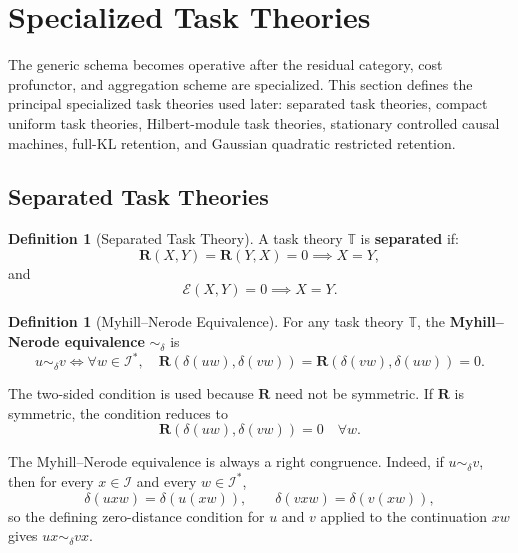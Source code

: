 \documentclass[12pt]{article}
\theoremstyle{definition}
\newtheorem{definition}[theorem]{Definition}
\begin{document}
\section{Specialized Task Theories}
\label{sec:specialized}

The generic schema becomes operative after the residual category, cost
profunctor, and aggregation scheme are specialized.  This section defines the
principal specialized task theories used later: separated task theories,
compact uniform task theories, Hilbert-module task theories, stationary
controlled causal machines, full-KL retention, and Gaussian quadratic
restricted retention.

\subsection{Separated Task Theories}
\label{subsec:separated}

\begin{definition}[Separated Task Theory]
\label{def:separated-task}
A task theory $\mathbb T$ is \textbf{separated} if:
\[
\mathbf R(X,Y)=\mathbf R(Y,X)=0
\implies
X=Y,
\]
and
\[
\mathcal E(X,Y)=0
\implies
X=Y.
\]
\end{definition}

\begin{definition}[Myhill--Nerode Equivalence]
\label{def:nerode}
For any task theory $\mathbb T$, the \textbf{Myhill--Nerode equivalence}
$\sim_\delta$ is
\[
u\sim_\delta v
\iff
\forall w\in\mathcal I^*,
\quad
\mathbf R(\delta(uw),\delta(vw))
=
\mathbf R(\delta(vw),\delta(uw))
=
0.
\]
\end{definition}

The two-sided condition is used because $\mathbf R$ need not be symmetric.  If
$\mathbf R$ is symmetric, the condition reduces to
\[
\mathbf R(\delta(uw),\delta(vw))=0
\quad
\forall w.
\]

The Myhill--Nerode equivalence is always a right congruence.  Indeed, if
$u\sim_\delta v$, then for every $x\in\mathcal I$ and every
$w\in\mathcal I^*$,
\[
\delta(uxw)=\delta(u(xw)),
\qquad
\delta(vxw)=\delta(v(xw)),
\]
so the defining zero-distance condition for $u$ and $v$ applied to the
continuation $xw$ gives $ux\sim_\delta vx$.
\end{document}
